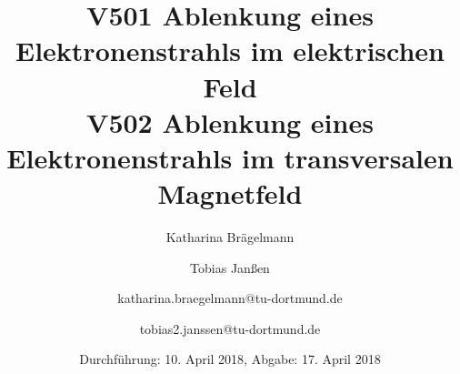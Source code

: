 
\title{V501 Ablenkung eines Elektronenstrahls im elektrischen Feld \\V502 Ablenkung eines Elektronenstrahls im transversalen Magnetfeld}
\author{Katharina Brägelmann \and Tobias Janßen \and katharina.braegelmann@tu-dortmund.de \and tobias2.janssen@tu-dortmund.de}
\date{Durchführung: 10. April 2018, Abgabe: 17. April 2018}
\maketitle

\tableofcontents
